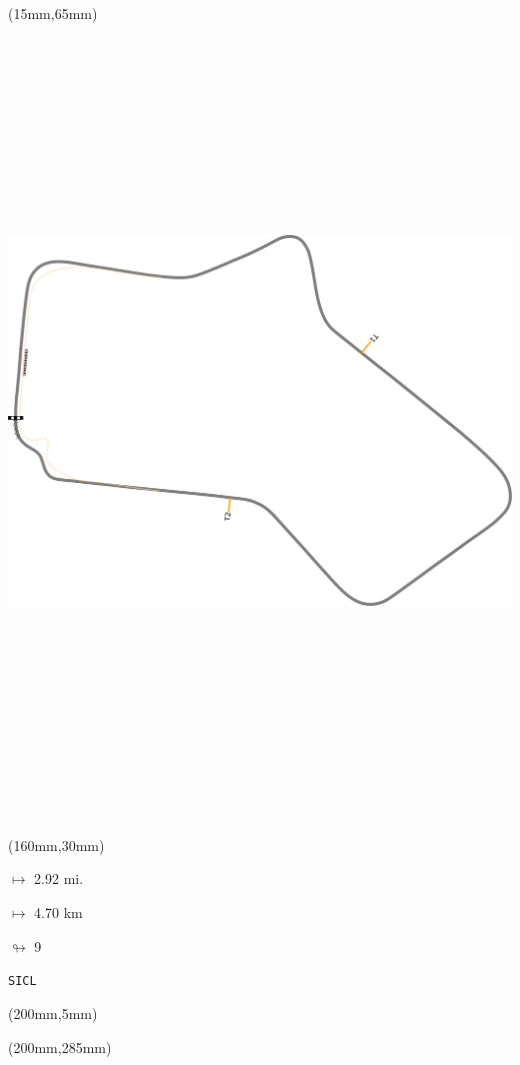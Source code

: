 \begin{textblock*}{185mm}(15mm,65mm)%
\centering
\mbox{\includegraphics[width=185mm,height=210mm,keepaspectratio]{PT/SICL.pdf}}
\end{textblock*}
\begin{textblock*}{40mm}(160mm,30mm)%
\Large
\par$\mapsto$ 2.92 mi.
\par$\mapsto$ 4.70 km
\par$\looparrowright$ 9
\par\hfill\tiny\tt SICL\\
\end{textblock*}
\begin{textblock*}{20mm}(200mm,5mm)%
\fbox{\thepage}
\label{SICL}
\end{textblock*}
\begin{textblock*}{20mm}(200mm,285mm)%
\fbox{\thepage}
\end{textblock*}

